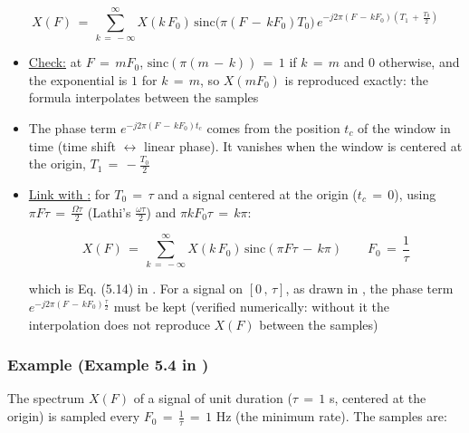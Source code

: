 \begin{equation}
\boxed{
X(F) \, = \, \sum_{k \, = \, -\infty}^{\infty} X(k \, F_0) \, \text{sinc}\big(\pi (F \, - \, k F_0) T_0\big) \, e^{-j 2 \pi (F \, - \, k F_0) \left( T_1 \, + \, \frac{T_0}{2} \right)}
}
\label{Eq:Sampling:spectral_interpolation}
\end{equation}

\begin{itemize}

\item \underline{Check:} at $F \, = \, m F_0$, $\text{sinc}(\pi (m \, - \, k)) \, = \, 1$ if $k \, = \, m$ and $0$ otherwise, and the exponential is $1$ for $k \, = \, m$, so $X(m F_0)$ is reproduced exactly: the formula interpolates between the samples

\item The phase term $e^{-j 2 \pi (F \, - \, k F_0) t_c}$ comes from the position $t_c$ of the window in time (time shift $\leftrightarrow$ linear phase). It vanishes when the window is centered at the origin, $T_1 \, = \, -\frac{T_0}{2}$

\item \underline{Link with \cite{signal_processing_Lathi}:} for $T_0 \, = \, \tau$ and a signal centered at the origin ($t_c \, = \, 0$), using $\pi F \tau \, = \, \frac{\Omega \tau}{2}$ (Lathi's $\frac{\omega \tau}{2}$) and $\pi k F_0 \tau \, = \, k \pi$:

\begin{equation}
X(F) \, = \, \sum_{k \, = \, -\infty}^{\infty} X(k \, F_0) \, \text{sinc}\left( \pi F \tau \, - \, k \pi \right) \qquad F_0 \, = \, \frac{1}{\tau}
\end{equation}

which is Eq. (5.14) in \cite{signal_processing_Lathi}. For a signal on $[0 \, , \, \tau]$, as drawn in \cite{signal_processing_Lathi}, the phase term $e^{-j 2 \pi (F \, - \, k F_0) \frac{\tau}{2}}$ must be kept (verified numerically: without it the interpolation does not reproduce $X(F)$ between the samples)

\end{itemize}

\subsubsection*{Example (Example 5.4 in \cite{signal_processing_Lathi})}

The spectrum $X(F)$ of a signal of unit duration ($\tau \, = \, 1$ s, centered at the origin) is sampled every $F_0 \, = \, \frac{1}{\tau} \, = \, 1$ Hz (the minimum rate). The samples are:

